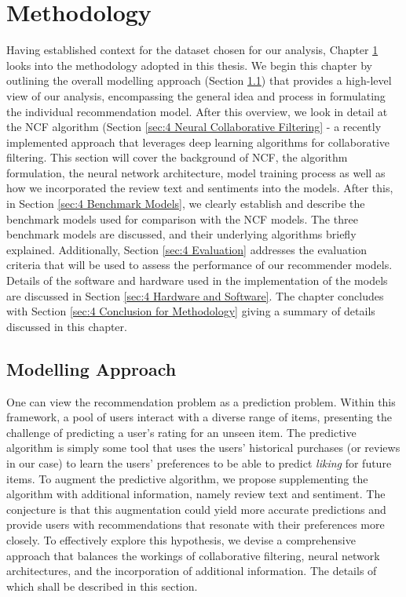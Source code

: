 \chapter{Methodology} %
\label{Chapter4}

Having established context for the dataset chosen for our analysis, Chapter \ref{Chapter4} looks into the methodology adopted in this thesis. We begin this chapter by outlining the overall modelling approach (Section \ref{sec:4 Modelling Approach}) that provides a high-level view of our analysis, encompassing the general idea and process in formulating the individual recommendation model. After this overview, we look in detail at the NCF algorithm (Section \ref{sec:4 Neural Collaborative Filtering} - a recently implemented approach that leverages deep learning algorithms for collaborative filtering. This section will cover the background of NCF, the algorithm formulation, the neural network architecture, model training process as well as how we incorporated the review text and sentiments into the models. After this, in Section \ref{sec:4 Benchmark Models}, we clearly establish and describe the benchmark models used for comparison with the NCF models. The three benchmark models are discussed, and their underlying algorithms briefly explained. Additionally, Section \ref{sec:4 Evaluation} addresses the evaluation criteria that will be used to assess the performance of our recommender models. Details of the software and hardware used in the implementation of the models are discussed in Section \ref{sec:4 Hardware and Software}. The chapter concludes with Section \ref{sec:4 Conclusion for Methodology} giving a summary of details discussed in this chapter.

\section{Modelling Approach}
\label{sec:4 Modelling Approach}

One can view the recommendation problem as a prediction problem. Within this framework, a pool of users interact with a diverse range of items, presenting the challenge of predicting a user's rating for an unseen item. The predictive algorithm is simply some tool that uses the users’ historical purchases (or reviews in our case) to learn the users’ preferences to be able to predict \textit{liking} for future items. To augment the predictive algorithm, we propose supplementing the algorithm with additional information, namely review text and sentiment. The conjecture is that this augmentation could yield more accurate predictions and provide users with recommendations that resonate with their preferences more closely. To effectively explore this hypothesis, we devise a comprehensive approach that balances the workings of collaborative filtering, neural network architectures, and the incorporation of additional information. The details of which shall be described in this section.

